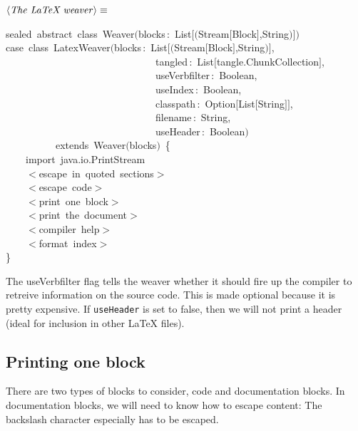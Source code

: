\documentclass[a4paper,12pt]{article}
\begin{document}
$\left<\mbox{\emph{The LaTeX weaver}}\right>\equiv$
\begin{program}{\vem sealed}~{\vem abstract}~{\vem class}~Weaver$($blocks\,{\rm :}~List$[$$($Stream$[$Block$]$,String$)$$]$$)$
\\[0.5em]{\vem case}~{\vem class}~LatexWeaver$($blocks\,{\rm :}~List$[$$($Stream$[$Block$]$,String$)$$]$,
\\~~~~~~~~~~~~~~~~~~~~~~~~~~~~~~tangled\,{\rm :}~List$[$tangle.ChunkCollection$]$,
\\~~~~~~~~~~~~~~~~~~~~~~~~~~~~~~useVerbfilter\,{\rm :}~Boolean,
\\~~~~~~~~~~~~~~~~~~~~~~~~~~~~~~useIndex\,{\rm :}~Boolean,
\\~~~~~~~~~~~~~~~~~~~~~~~~~~~~~~classpath\,{\rm :}~Option$[$List$[$String$]$$]$,
\\~~~~~~~~~~~~~~~~~~~~~~~~~~~~~~filename\,{\rm :}~String,
\\~~~~~~~~~~~~~~~~~~~~~~~~~~~~~~useHeader\,{\rm :}~Boolean$)$
\\~~~~~~~~~~{\vem extends}~Weaver$($blocks$)$~{\small\{}
\\[0.5em]~~~~{\vem import}~java.io.PrintStream
\\[0.5em]~~~~$<$escape~in~quoted~sections$>$
\\[0.5em]~~~~$<$escape~code$>$
\\[0.5em]~~~~$<$print~one~block$>$
\\[0.5em]~~~~$<$print~the~document$>$
\\[0.5em]~~~~$<$compiler~help$>$
\\[0.5em]~~~~$<$format~index$>$
\\{\small\}}
\\[0.5em]\end{program}
The useVerbfilter flag tells the weaver whether it should fire up the compiler
to retreive information on the source code. This is made optional because
it is pretty expensive. If \texttt{useHeader} is set to false, then we will not
print a header (ideal for inclusion in other LaTeX files).

\subsection{Printing one block}
There are two types of blocks to consider, code and documentation blocks. In
documentation blocks, we will need to know how to escape content: The backslash
character especially has to be escaped.
\end{document}
